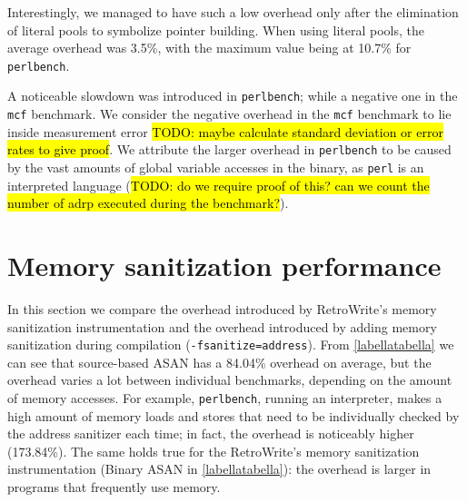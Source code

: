 \documentclass[a4paper,11pt,oneside]{report}
\newcommand{\sysname}{RetroWrite\xspace}
\DeclareRobustCommand{\todo}[1]{{\sethlcolor{cyan}\hl{TODO: #1}}}
\begin{document}
Interestingly, we managed to have such a low overhead only after the
elimination of literal pools to symbolize pointer building. When using literal
pools, the average overhead was 3.5\%, with the maximum value being at 10.7\%
for \texttt{perlbench}. 

A noticeable slowdown was introduced in \texttt{perlbench}; while a negative
one in the \texttt{mcf} benchmark. We consider the negative overhead in the
\texttt{mcf} benchmark to lie inside measurement error \todo{maybe calculate
standard deviation or error rates to give proof}. We attribute the larger
overhead in \texttt{perlbench} to be caused by the vast amounts of global
variable accesses in the binary, as \texttt{perl} is an interpreted language
(\todo{do we require proof of this?  can we count the number of adrp executed
during the benchmark?}).


\section{Memory sanitization performance}

In this section we compare the overhead introduced by \sysname's memory
sanitization instrumentation and the overhead introduced by adding memory
sanitization during compilation (\texttt{-fsanitize=address}).  From
\autoref{labellatabella} we can see that source-based ASAN has a 84.04\%
overhead on average, but the overhead varies a lot between individual
benchmarks, depending on the amount of memory accesses. For example,
\texttt{perlbench}, running an interpreter, makes a high amount of memory loads
and stores that need to be individually checked by the address sanitizer each
time; in fact, the overhead is noticeably higher (173.84\%). The same holds
true for the \sysname's memory sanitization instrumentation (Binary ASAN in
\autoref{labellatabella}): the overhead is larger in programs that frequently
use memory. 
\end{document}
